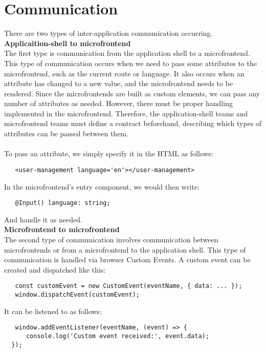\section{Communication}
There are two types of inter-application communication occurring. \\

\noindent
\textbf{Applicaition-shell to microfrontend}\\
The first type is communication from the application shell to a microfrontend. This type of communication occurs when we need to pass some attributes to the microfrontend, such as the current route or language. It also occurs when an attribute has changed to a new value, and the microfrontend needs to be rendered. Since the microfrontends are built as custom elements, we can pass any number of attributes as needed. However, there must be proper handling implemented in the microfrontend. Therefore, the application-shell teams and microfrontend teams must define a contract beforehand, describing which types of attributes can be passed between them.\\\\
To pass an attribute, we simply specify it in the HTML as follows:
\begin{verbatim}
   <user-management language='en'></user-management>
\end{verbatim}
In the microfrontend's entry component, we would then write:
\begin{verbatim}
   @Input() language: string;
\end{verbatim}
And handle it as needed. \\

\noindent
\textbf{Microfrontend to microfrontend}\\
The second type of communication involves communication between microfrontends or from a microfrontend to the application shell. This type of communication is handled via browser Custom Events. A custom event can be created and dispatched like this:
\begin{verbatim}
   const customEvent = new CustomEvent(eventName, { data: ... });
   window.dispatchEvent(customEvent);
\end{verbatim}
It can be listened to as follows:
\begin{verbatim}
   window.addEventListener(eventName, (event) => {
      console.log('Custom event received:', event.data);
  });
\end{verbatim}